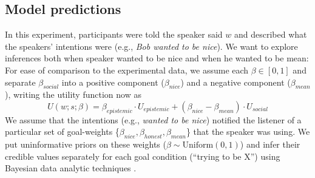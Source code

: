 \documentclass[10pt,letterpaper]{article}
\begin{document}

\subsection{Model predictions}


In this experiment, participants were told the speaker said $w$ and described what the speakers' intentions were (e.g., \emph{Bob wanted to be nice}).
We want to explore inferences both when speaker wanted to be nice and when he wanted to be mean: For ease of comparison to the experimental data, we assume each $\beta \in [0,1]$ and separate $\beta_{social}$ into a positive component ($\beta_{nice}$) and a negative component ($\beta_{mean}$), writing the utility function now as
$$
 U(w;s; \beta)  =  \beta_{epistemic}\cdot U_{epistemic} + (\beta_{nice} - \beta_{mean}) \cdot U_{social}
 $$
We assume that the intentions (e.g., \emph{wanted to be nice}) notified the listener of a particular set of goal-weights \{$\beta_{nice}, \beta_{honest}, \beta_{mean}$\} that the speaker was using.
We put uninformative priors on these weights ($\beta \sim \text{Uniform}(0,1)$) and infer their credible values separately for each goal condition (``trying to be X'') using Bayesian data analytic techniques \cite{LW2014}.
\end{document}
